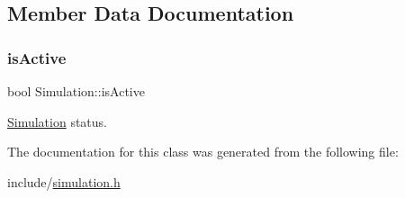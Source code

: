 \subsection{Member Data Documentation}
\mbox{\label{classSimulation_ad76dc6e6d56b95b074f3824340f91a4c}} 
\subsubsection{\texorpdfstring{isActive}{isActive}}
{\footnotesize\ttfamily bool Simulation\+::is\+Active\hspace{0.3cm}{\ttfamily [private]}}



\mbox{\hyperlink{classSimulation}{Simulation}} status. 



The documentation for this class was generated from the following file\+:\begin{DoxyCompactItemize}
\item 
include/\mbox{\hyperlink{simulation_8h}{simulation.\+h}}\end{DoxyCompactItemize}
